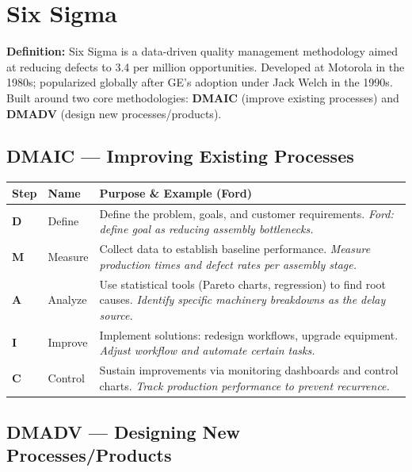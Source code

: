 \documentclass[11pt, letterpaper]{article}
\begin{document}
\newpage

\section{Six Sigma}

\begin{defbox}
\textbf{Definition:} Six Sigma is a data-driven quality management methodology aimed at reducing defects to 3.4 per million opportunities. Developed at Motorola in the 1980s; popularized globally after GE's adoption under Jack Welch in the 1990s. Built around two core methodologies: \textbf{DMAIC} (improve existing processes) and \textbf{DMADV} (design new processes/products).
\end{defbox}

\subsection{DMAIC --- Improving Existing Processes}

\begin{center}
\begin{tabular}{>{\bfseries}p{2cm} p{4cm} p{6.5cm}}
\toprule
Step & Name & Purpose \& Example (Ford) \\
\midrule
D & Define & Define the problem, goals, and customer requirements. \textit{Ford: define goal as reducing assembly bottlenecks.} \\
M & Measure & Collect data to establish baseline performance. \textit{Measure production times and defect rates per assembly stage.} \\
A & Analyze & Use statistical tools (Pareto charts, regression) to find root causes. \textit{Identify specific machinery breakdowns as the delay source.} \\
I & Improve & Implement solutions: redesign workflows, upgrade equipment. \textit{Adjust workflow and automate certain tasks.} \\
C & Control & Sustain improvements via monitoring dashboards and control charts. \textit{Track production performance to prevent recurrence.} \\
\bottomrule
\end{tabular}
\end{center}

\subsection{DMADV --- Designing New Processes/Products}
\end{document}
